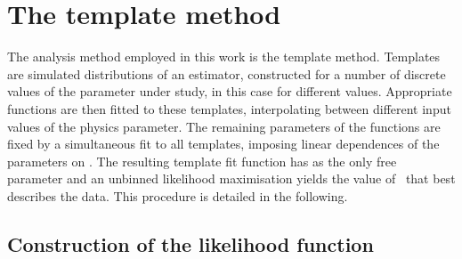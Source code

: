 

































\clearpage






\section{The template method}
The analysis method employed in this work is the template method. 
%
Templates are simulated distributions of an estimator, constructed for a number of discrete values of the parameter under study, in this case for different \mt values. 
%
Appropriate functions are then fitted to these templates, interpolating between different input values of the physics parameter. 
%
The remaining parameters of the functions are fixed by a simultaneous fit to all templates, imposing linear dependences of the parameters on \mt. 
%
The resulting template fit function has \mt as the only free parameter and an unbinned likelihood maximisation yields the value of \mt\ that best describes the data. 
%
This procedure is detailed in the following.












\subsection{Construction of the likelihood function}
\label{sect:like7TeV}

